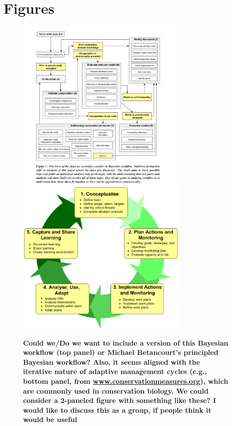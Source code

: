 \documentclass{article}
\begin{document}


\section* {Figures}
 \begin{figure}[h]
\centering
 \includegraphics[width=0.75\textwidth]{../figs/BayesianWorkflowfromGelman2020.jpg}
  \includegraphics[width=0.75\textwidth]{../figs/The-Open-Standards-adaptive-management-cycle-from-wwwconservationmeasuresorg.png}
 \caption{\textbf{Could we/Do we want to include a version of this Bayesian workflow \citep{gelman2020bayesian} (top panel) or Michael Betancourt's principled Bayesian workflow? Also, it seems aligned with the iterative nature of adaptive management cycles (e.g., bottom panel, from \href{www.conservationmeasures.org}{www.conservationmeasures.org}), which are commonly used in conservation biology. We could consider a 2-paneled figure with something like these? I would like to discuss this as a group, if people think it would be useful}} 
 \label{fig:workflow}
 \end{figure}
\end{document}

